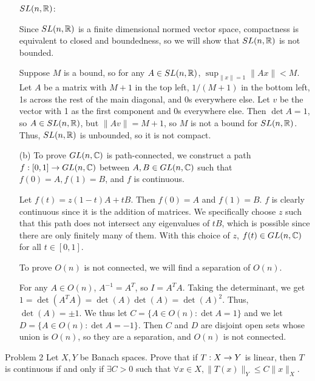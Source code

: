 \documentclass{hmwk}
\begin{document}
\begin{solution}
\begin{itemize}
    \pre $SL(n, \mathbb{R})$:

    Since $SL(n, \mathbb{R})$ is a finite dimensional normed vector space, compactness is equivalent to closed and boundedness, so we will show that $SL(n, \mathbb{R})$ is not bounded. 

    Suppose $M$ is a bound, so for any $A \in SL(n, \mathbb{R})$, $\sup_{\|x\| = 1}\|Ax\| < M$. Let $A$ be a matrix with $M + 1$ in the top left, $1/(M+1)$ in the bottom left, 1s across the rest of the main diagonal, and 0s everywhere else. Let $v$ be the vector with 1 as the first component and 0s everywhere else. Then $\det A = 1$, so $A \in SL(n, \mathbb{R})$, but  $\|Av\| = M + 1$, so $M$ is not a bound for $SL(n, \mathbb{R})$. Thus, $SL(n, \mathbb{R})$ is unbounded, so it is not compact.

    \item[(b)] To prove $GL(n, \mathbb{C})$ is path-connected, we construct a path $f: [0, 1] \rightarrow GL(n, \mathbb{C})$ between $A, B \in GL(n, \mathbb{C})$ such that $f(0) = A, f(1) = B$, and $f$ is continuous. 

    Let $f(t) = z(1 - t)A + tB$. Then $f(0) = A$ and $f(1) = B$. $f$ is clearly continuous since it is the addition of matrices. We specifically choose $z$ such that this path does not intersect any eigenvalues of $tB$, which is possible since there are only finitely many of them. With this choice of $z$, $f(t) \in GL(n, \mathbb{C})$ for all $t \in [0, 1]$. 

    To prove $O(n)$ is not connected, we will find a separation of $O(n)$. 

    For any $A \in O(n)$, $A^{-1} = A^T$, so $I = A^TA$. Taking the determinant, we get $1 = \det(A^TA) = \det(A)\det(A) = \det(A)^2$. Thus, $\det(A) = \pm 1$. We thus let $C = \{A \in O(n) : \det A = 1\}$ and we let $D = \{A \in O(n) : \det A = -1\}$. Then $C$ and $D$ are disjoint open sets whose union is $O(n)$, so they are a separation, and $O(n)$ is not connected. 
\end{itemize}
\end{solution}

\begin{problem}{Problem 2}
Let $X, Y$ be Banach spaces. Prove that if $T: X \rightarrow Y$ is linear, then $T$ is continuous if and only if $\exists C > 0$ such that $\forall x \in X, \|T(x)\|_Y \leq C\|x\|_X$. 
\end{problem}
\end{document}
